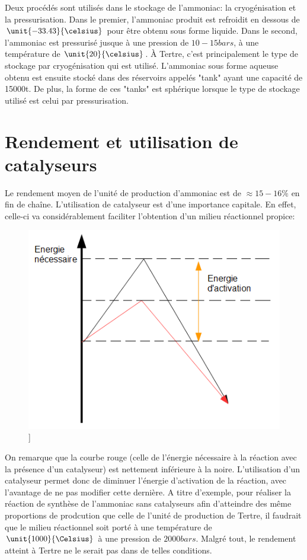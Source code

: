 Deux procédés sont utilisés dans le stockage de l'ammoniac: la cryogénisation et la pressurisation. Dans le premier, l'ammoniac produit est refroidit en dessous de $\unit{-33.43}{\celsius}$ pour être obtenu sous forme liquide. Dans le second, l'ammoniac est pressurisé jusque à une pression de $\unit{10-15}{bars}$, à une température de $\unit{20}{\celsius}$. À Tertre, c'est principalement le type de stockage par cryogénisation qui est utilisé. L'ammoniac sous forme aqueuse obtenu est ensuite stocké dans des réservoirs appelés "tank" ayant une capacité de 15000t. De plus, la forme de ces "tanks" est sphérique lorsque le type de stockage utilisé est celui par pressurisation.


\section*{Rendement et utilisation de catalyseurs}
Le rendement moyen de l'unité de production d'ammoniac est de $\approx 15-16\%$ en fin de chaîne. L'utilisation de catalyseur est d'une importance capitale. En effet, celle-ci va considérablement faciliter l'obtention d'un milieu réactionnel propice:

\begin{figure} [h]
\begin{center}
\includegraphics[scale=0.5]{schrend}]
\end{center}
\end{figure}

On remarque que la courbe rouge (celle de l'énergie nécessaire à la réaction avec la présence d'un catalyseur) est nettement inférieure à la noire. L'utilisation d'un catalyseur permet donc de diminuer l'énergie d'activation de la réaction, avec l'avantage de ne pas modifier cette dernière. A titre d'exemple, pour réaliser la réaction de synthèse de l'ammoniac sans catalyseurs afin d'atteindre des même proportions de prodcution que celle de l'unité de production de Tertre, il faudrait que le milieu réactionnel soit porté à une température de $\unit{1000}{\Celsius}$ à une pression de $\unit{2000}{bars}$. Malgré tout, le rendement atteint à Tertre ne le serait pas dans de telles conditions.

